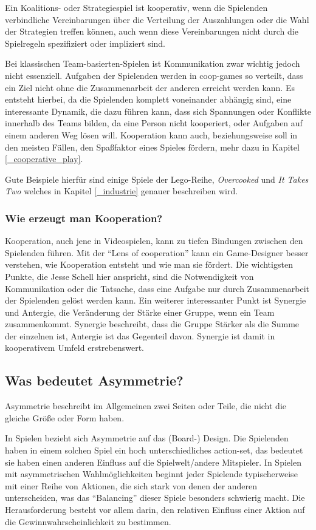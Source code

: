 Ein Koalitions- oder Strategiespiel ist kooperativ, wenn die Spielenden verbindliche Vereinbarungen über die Verteilung der Auszahlungen oder die Wahl der Strategien treffen können, auch wenn diese Vereinbarungen nicht durch die Spielregeln spezifiziert oder impliziert sind\cite{_theory_of_cooperative_games}.

Bei klassischen Team-basierten-Spielen ist Kommunikation zwar wichtig jedoch nicht essenziell. Aufgaben der Spielenden werden in coop-games so verteilt, dass ein Ziel nicht ohne die Zusammenarbeit der anderen erreicht werden kann. Es entsteht hierbei, da die Spielenden komplett voneinander abhängig sind, eine interessante Dynamik, die dazu führen kann, dass sich Spannungen oder Konflikte innerhalb des Teams bilden, da eine Person nicht kooperiert, oder Aufgaben auf einem anderen Weg lösen will. Kooperation kann auch, beziehungsweise soll in den meisten Fällen, den Spaßfaktor eines Spieles fördern, mehr dazu in Kapitel \ref{_cooperative_play}.

Gute Beispiele hierfür sind einige Spiele der Lego-Reihe, \emph{Overcooked} und \emph{It Takes Two} welches in Kapitel \ref{_industrie} genauer beschreiben wird.

\subsubsection{Wie erzeugt man Kooperation?}
Kooperation, auch jene in Videospielen, kann zu tiefen Bindungen zwischen den Spielenden führen.
Mit der "`Lens of cooperation"'\cite[S. 311]{_gamemechanics_for_cooperative_games} kann ein Game-Designer besser verstehen, wie Kooperation entsteht und wie man sie fördert. Die wichtigsten Punkte, die Jesse Schell hier anspricht, sind die Notwendigkeit von Kommunikation oder die Tatsache, dass eine Aufgabe nur durch Zusammenarbeit der Spielenden gelöst werden kann. Ein weiterer interessanter Punkt ist Synergie und Antergie, die Veränderung der Stärke einer Gruppe, wenn ein Team zusammenkommt. Synergie beschreibt, dass die Gruppe Stärker als die Summe der einzelnen ist, Antergie ist das Gegenteil davon. Synergie ist damit in kooperativem Umfeld erstrebenswert.

\subsection{Was bedeutet Asymmetrie?}

Asymmetrie beschreibt im Allgemeinen zwei Seiten oder Teile, die nicht die gleiche Größe oder Form haben\cite{_oxford_dict}.

In Spielen bezieht sich Asymmetrie auf das (Board-) Design. Die Spielenden haben in einem solchen Spiel ein hoch unterschiedliches action-set, das bedeutet sie haben einen anderen Einfluss auf die Spielwelt/andere Mitspieler. In Spielen mit asymmetrischen Wahlmöglichkeiten beginnt jeder Spielende typischerweise mit einer Reihe von Aktionen, die sich stark von denen der anderen unterscheiden, was das "`Balancing"' dieser Spiele besonders schwierig macht. Die Herausforderung besteht vor allem darin, den relativen Einfluss einer Aktion auf die Gewinnwahrscheinlichkeit zu bestimmen\cite[S. 18]{_balancing_asymmetric_video_games}.
